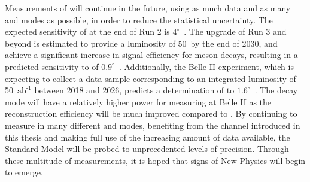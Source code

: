 Measurements of \Pgamma will continue in the future, using as much data and as many \B and \D modes as possible, in order to reduce the statistical uncertainty. The expected sensitivity of \Pgamma at the end of Run 2 is $4^{\circ}$~\cite{LHCb-PAPER-2012-031}. The upgrade of Run 3 and beyond is estimated to provide a luminosity of 50~\invfb by the end of 2030, and achieve a significant increase in signal efficiency for \B meson decays, resulting in a predicted sensitivity to \Pgamma of $0.9^{\circ}$~\cite{LHCb-PAPER-2012-031}. Additionally, the Belle II experiment, which is expecting to collect a data sample corresponding to an integrated luminosity of 50~$\text{ab}^{\text{-1}}$ between 2018 and 2026, predicts a determination of \Pgamma to $1.6^{\circ}$~\cite{BelleII}. The \decay{\Bm}{\D\Kstarm(\KS\pim)} decay mode will have a relatively higher power for measuring \Pgamma at Belle II as the \KS reconstruction efficiency will be much improved compared to \lhcb. By continuing to measure \Pgamma in many different \B and \D modes, benefiting from the \btodkst channel introduced in this thesis and making full use of the increasing amount of data available, the Standard Model will be probed to unprecedented levels of precision. Through these multitude of measurements, it is hoped that signs of New Physics will begin to emerge.

\clearpage